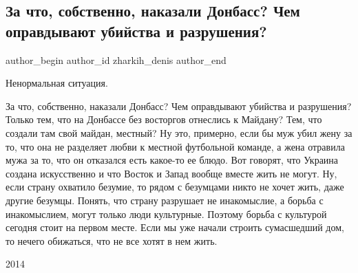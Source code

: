  
 
 
 
 
 
\subsection{За что, собственно, наказали Донбасс? Чем оправдывают убийства и разрушения?}
\label{sec:02_08_2021.fb.zharkih_denis.1.donbass_nakazanie}
 
\ifcmt
 author_begin
   author_id zharkih_denis
 author_end
\fi

Ненормальная ситуация.

За что, собственно, наказали Донбасс? Чем оправдывают убийства и разрушения?
Только тем, что на Донбассе без восторгов отнеслись к Майдану? Тем, что создали
там свой майдан, местный? Ну это, примерно, если бы муж убил жену за то, что
она не разделяет любви к местной футбольной команде, а жена отравила мужа за
то, что он отказался есть какое-то ее блюдо. Вот говорят, что Украина создана
искусственно и что Восток и Запад вообще вместе жить не могут. Ну, если страну
охватило безумие, то рядом с безумцами никто не хочет жить, даже другие
безумцы. Понять, что страну разрушает не инакомыслие, а борьба с инакомыслием,
могут только люди культурные. Поэтому борьба с культурой сегодня стоит на
первом месте.   Если мы уже начали строить сумасшедший дом, то нечего
обижаться, что не все хотят в нем жить.

2014

